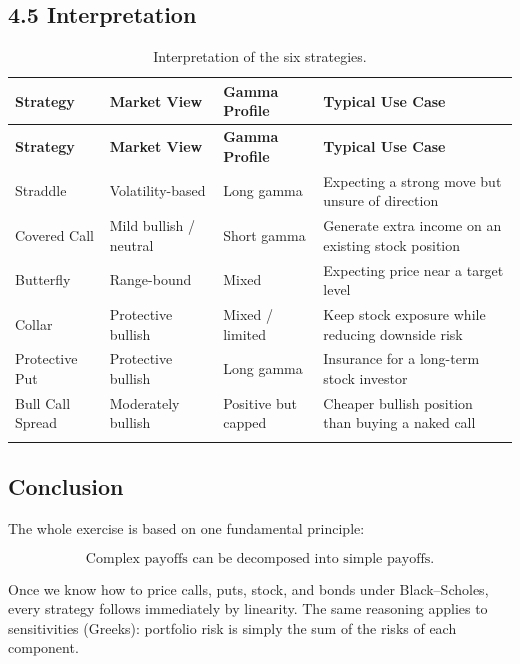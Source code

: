 \documentclass[11pt]{article}
\begin{document}
\subsection*{4.5 Interpretation}

\begin{center}
\small
\begin{longtable}{p{2.8cm} p{3.3cm} p{3.2cm} p{5.2cm}}
\toprule
\textbf{Strategy} & \textbf{Market View} & \textbf{Gamma Profile} & \textbf{Typical Use Case} \\
\midrule
\endfirsthead

\toprule
\textbf{Strategy} & \textbf{Market View} & \textbf{Gamma Profile} & \textbf{Typical Use Case} \\
\midrule
\endhead

Straddle &
Volatility-based &
Long gamma &
Expecting a strong move but unsure of direction
\\

Covered Call &
Mild bullish / neutral &
Short gamma &
Generate extra income on an existing stock position
\\

Butterfly &
Range-bound &
Mixed &
Expecting price near a target level
\\

Collar &
Protective bullish &
Mixed / limited &
Keep stock exposure while reducing downside risk
\\

Protective Put &
Protective bullish &
Long gamma &
Insurance for a long-term stock investor
\\

Bull Call Spread &
Moderately bullish &
Positive but capped &
Cheaper bullish position than buying a naked call
\\

\bottomrule
\caption{Interpretation of the six strategies.}
\end{longtable}
\end{center}

\subsection*{Conclusion}

The whole exercise is based on one fundamental principle:

\[
\boxed{\text{Complex payoffs can be decomposed into simple payoffs.}}
\]

Once we know how to price calls, puts, stock, and bonds under Black--Scholes, every strategy follows immediately by linearity. The same reasoning applies to sensitivities (Greeks): portfolio risk is simply the sum of the risks of each component.
\end{document}
